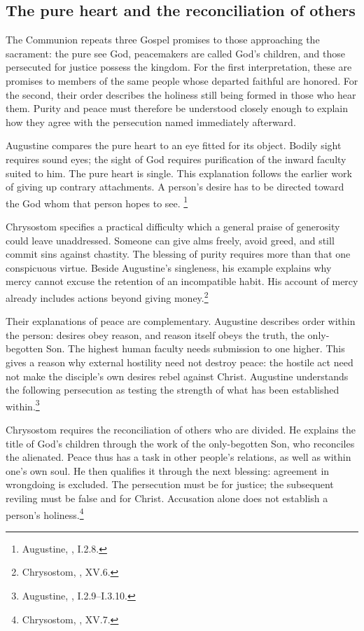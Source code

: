 \subsection{The pure heart and the reconciliation of others}
The Communion repeats three Gospel promises to those approaching
the sacrament: the pure see God, peacemakers are called God's
children, and those persecuted for justice possess the kingdom.
For the first interpretation, these are promises to members
of the same people whose departed faithful are honored.
For the second, their order describes the holiness still being
formed in those who hear them. Purity and peace must therefore
be understood closely enough to explain how they agree with
the persecution named immediately afterward.

Augustine compares the pure heart to an eye fitted for its object.
Bodily sight requires sound eyes; the sight of God requires
purification of the inward faculty suited to him. The pure
heart is single. This explanation follows the earlier work
of giving up contrary attachments. A person's desire has
to be directed toward the God whom that person hopes to see.
\footnote{Augustine, , I.2.8.}

Chrysostom specifies a practical difficulty which a general
praise of generosity could leave unaddressed. Someone can
give alms freely, avoid greed, and still commit sins against
chastity. The blessing of purity requires more than that
one conspicuous virtue. Beside Augustine's singleness, his
example explains why mercy cannot excuse the retention of
an incompatible habit. His account of mercy already includes
actions beyond giving money.\footnote{Chrysostom,
, XV.6.}

Their explanations of peace are complementary. Augustine
describes order within the person: desires obey reason, and
reason itself obeys the truth, the only-begotten Son. The
highest human faculty needs submission to one higher.
This gives a reason why external hostility need not destroy
peace: the hostile act need not make the disciple's own
desires rebel against Christ. Augustine understands the
following persecution as testing the strength of what has
been established within.\footnote{Augustine,
, I.2.9--I.3.10.}

Chrysostom requires the reconciliation of others who are
divided. He explains the title of God's children through
the work of the only-begotten Son, who reconciles the
alienated. Peace thus has a task in other people's relations,
as well as within one's own soul. He then qualifies it
through the next blessing: agreement in wrongdoing is
excluded. The persecution must be for justice; the subsequent
reviling must be false and for Christ. Accusation alone
does not establish a person's holiness.\footnote{Chrysostom,
, XV.7.}

